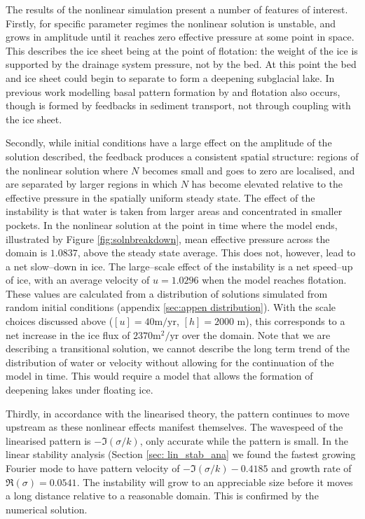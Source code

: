 \documentclass[journal abbreviation, manuscript]{copernicus}
\begin{document}
The results of the nonlinear simulation present a number of features of interest.
Firstly, for specific parameter regimes the nonlinear solution is unstable, and grows in amplitude until it reaches zero effective pressure at some point in space. This describes the ice sheet being at the point of flotation: the weight of the ice is supported by the drainage system pressure, not by the bed. At this point the bed and ice sheet could begin to separate to form a deepening subglacial lake. In previous work modelling basal pattern formation by \citet{hindmarsh1998ice} and \citet{fowler2000instability} flotation also occurs, though is formed by feedbacks in sediment transport, not through coupling with the ice sheet.

Secondly, while initial conditions have a large effect on the amplitude of the solution described, the feedback produces a consistent spatial structure:  regions of the nonlinear solution where $N$ becomes small and goes to zero 
are localised, and are separated by larger regions in which $N$ 
has become elevated relative to the effective pressure in the spatially 
uniform steady state. The effect of the instability is that water is taken from larger areas and concentrated in smaller pockets. 
In the nonlinear solution at the point in time where the model ends, illustrated by Figure \ref{fig:solnbreakdown}, mean effective pressure across the domain is $1.0837$, above the steady state average. This does not, however, lead to a net slow--down in ice.  The large--scale effect of the instability is a net speed--up of ice, with an average velocity  of $ u = 1.0296$ when the model reaches flotation.  These values are calculated from a distribution of solutions simulated from random initial conditions (appendix \ref{sec:appen distribution}). With the scale choices discussed above ($[u]=40 \mbox{m}/\mbox{yr}$, $[h] = 2000 \mbox{ m}$), this corresponds to a net increase in the ice flux of $2 370\mbox{m}^2/\mbox{yr}$ over the domain.
Note that we are describing a transitional solution, we cannot describe the long term trend of the distribution of water or velocity without allowing for the continuation of the model in time. This would require a model that allows the formation of deepening lakes under floating ice.  

Thirdly, in accordance with the linearised theory, the pattern continues to move 
upstream as these nonlinear effects manifest themselves.
The wavespeed of the linearised pattern is $ -\Im (\sigma / k )$, only accurate while the pattern is small. In the linear stability analysis (Section \ref{sec: lin_stab_ana} we found the fastest growing Fourier mode to have pattern velocity of $-\Im(\sigma/k) -0.4185$ and growth rate of $\Re ( \sigma )=0.0541 $. The instability will grow to an appreciable size before it moves a long distance relative to a reasonable domain. This is confirmed by the numerical solution.
\end{document}
